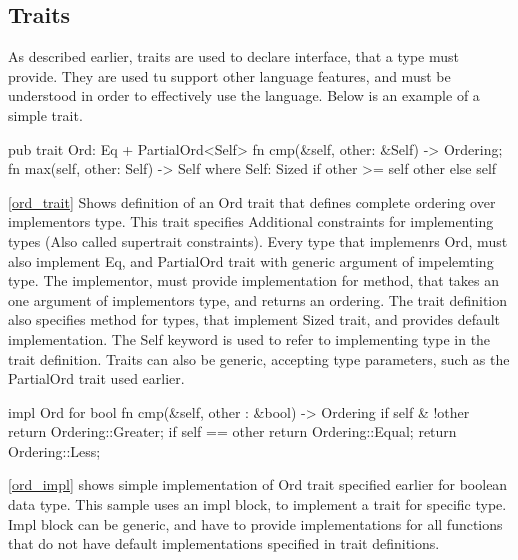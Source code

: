 \subsection{Traits}
As described earlier, traits are used to declare interface, that a type must provide. They are used tu support
other language features, and must be understood in order to effectively use the language.
Below is an example of a simple trait.


\begin{code}[language=rust,label={ord_trait},caption={Trait definition}]
    pub trait Ord: Eq + PartialOrd<Self> {
        fn cmp(&self, other: &Self) -> Ordering;
        fn max(self, other: Self) -> Self where Self: Sized {
            if other >= self { other } else { self }
        }
    }
\end{code}

\autoref{ord_trait} Shows definition of an Ord trait that defines complete ordering over implementors type. This trait specifies Additional constraints for implementing types
(Also called supertrait constraints). Every type that implemenrs Ord, must also implement Eq, and PartialOrd trait with generic
argument of impelemting type. The implementor, must provide implementation for  method, that takes an one argument of implementors type,
and returns an ordering. The trait definition also specifies  method for types, that implement Sized trait, and provides default
implementation.
The Self keyword is used to refer to implementing type in the trait definition.
Traits can also be generic, accepting type parameters, such as the PartialOrd trait used earlier.

\begin{code}[language=rust,label={ord_impl},caption={Trait implementation}]
    impl Ord for bool {
        fn cmp(&self, other : &bool) -> Ordering {
            if self & !other {
                return Ordering::Greater;
            }
            if self == other {
                return Ordering::Equal;
            }
            return Ordering::Less;
        }
    }
\end{code}

\autoref{ord_impl} shows simple implementation of Ord trait specified earlier for boolean data type. This sample
uses an impl block, to implement a trait for specific type. Impl block can be generic, and have to provide
implementations for all functions that do not have default implementations specified in trait definitions.

